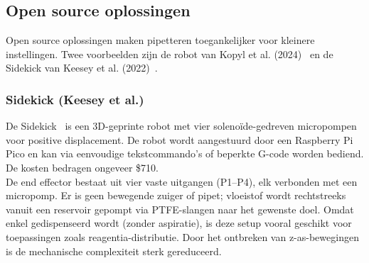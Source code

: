 \subsection{Open source oplossingen}
Open source oplossingen maken pipetteren toegankelijker voor kleinere instellingen. Twee voorbeelden zijn de robot van Kopyl et al. (2024)\ \cite{RN42} en de Sidekick van Keesey et al. (2022)\ \cite{RN41}.

\subsubsection{Sidekick (Keesey et al.)}
De Sidekick\ \cite{RN41} is een 3D-geprinte robot met vier solenoïde-gedreven micropompen voor positive displacement. De robot wordt aangestuurd door een Raspberry Pi Pico en kan via eenvoudige tekstcommando’s of beperkte G-code worden bediend. De kosten bedragen ongeveer \$710.
\\[12pt]De end effector bestaat uit vier vaste uitgangen (P1–P4), elk verbonden met een micropomp. Er is geen bewegende zuiger of pipet; vloeistof wordt rechtstreeks vanuit een reservoir gepompt via PTFE-slangen naar het gewenste doel. Omdat enkel gedispenseerd wordt (zonder aspiratie), is deze setup vooral geschikt voor toepassingen zoals reagentia-distributie. Door het ontbreken van z-as-bewegingen is de mechanische complexiteit sterk gereduceerd.

